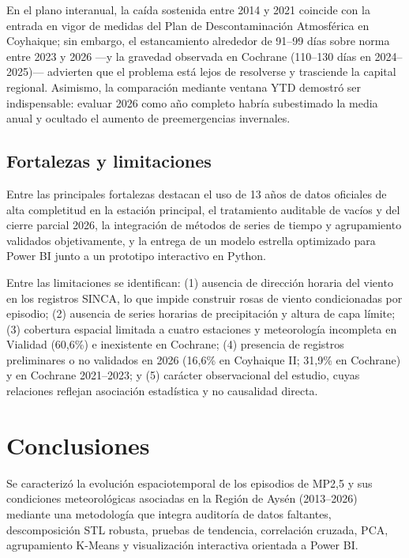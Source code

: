 \documentclass[conference]{IEEEtran}
\begin{document}
En el plano interanual, la ca{\'i}da sostenida entre 2014 y 2021 coincide con la entrada en vigor de medidas del Plan de Descontaminaci{\'o}n Atmosf{\'e}rica en Coyhaique; sin embargo, el estancamiento alrededor de 91--99 d{\'i}as sobre norma entre 2023 y 2026 ---y la gravedad observada en Cochrane (110--130 d{\'i}as en 2024--2025)--- advierten que el problema est{\'a} lejos de resolverse y trasciende la capital regional. Asimismo, la comparaci{\'o}n mediante ventana YTD demostr{\'o} ser indispensable: evaluar 2026 como a{\~n}o completo habr{\'i}a subestimado la media anual y ocultado el aumento de preemergencias invernales.

\subsection{Fortalezas y limitaciones}
Entre las principales fortalezas destacan el uso de 13 a{\~n}os de datos oficiales de alta completitud en la estaci{\'o}n principal, el tratamiento auditable de vac{\'i}os y del cierre parcial 2026, la integraci{\'o}n de m{\'e}todos de series de tiempo y agrupamiento validados objetivamente, y la entrega de un modelo estrella optimizado para Power BI junto a un prototipo interactivo en Python.

Entre las limitaciones se identifican: (1) ausencia de direcci{\'o}n horaria del viento en los registros SINCA, lo que impide construir rosas de viento condicionadas por episodio; (2) ausencia de series horarias de precipitaci{\'o}n y altura de capa l{\'i}mite; (3) cobertura espacial limitada a cuatro estaciones y meteorolog{\'i}a incompleta en Vialidad (60,6\%) e inexistente en Cochrane; (4) presencia de registros preliminares o no validados en 2026 (16,6\% en Coyhaique II; 31,9\% en Cochrane) y en Cochrane 2021--2023; y (5) car{\'a}cter observacional del estudio, cuyas relaciones reflejan asociaci{\'o}n estad{\'i}stica y no causalidad directa.

\section{Conclusiones}

Se caracteriz{\'o} la evoluci{\'o}n espaciotemporal de los episodios de MP2,5 y sus condiciones meteorol{\'o}gicas asociadas en la Regi{\'o}n de Ays{\'e}n (2013--2026) mediante una metodolog{\'i}a que integra auditor{\'i}a de datos faltantes, descomposici{\'o}n STL robusta, pruebas de tendencia, correlaci{\'o}n cruzada, PCA, agrupamiento K-Means y visualizaci{\'o}n interactiva orientada a Power BI.
\end{document}

